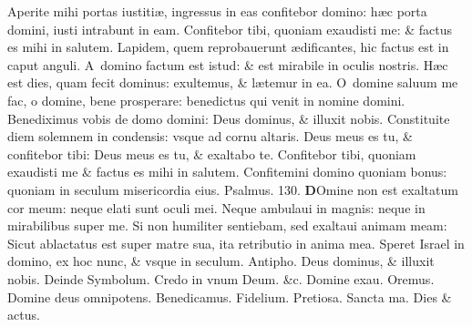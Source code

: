 \documentclass[a5paper,10pt]{book}
\def\ae{æ}
\begin{document}
\begin{multicols*}{2}
\newline \color{red} A\color{black}perite mihi portas iustiti\ae , ingressus in eas confitebor domino: h\ae c porta domini, iusti intrabunt in eam.
\newline \color{red} C\color{black}onfitebor tibi, quoniam exaudisti me: \& factus es mihi in salutem.
\newline \color{red} L\color{black}apidem, quem reprobauerunt \ae dificantes, hic factus est in caput anguli.
\newline \color{red} A\color{black}\ domino factum est istud: \& est mirabile in oculis nostris.
\newline \color{red} H\color{black}\ae c est dies, quam fecit dominus: exultemus, \& l\ae temur in ea.
\newline \color{red} O\color{black}\ domine saluum me fac, o domine, bene prosperare: benedictus qui venit in nomine domini.
\newline \color{red} B\color{black}enediximus vobis de domo domini: Deus dominus, \& illuxit nobis.
\newline \color{red} C\color{black}onstituite diem solemnem in condensis: vsque ad cornu altaris.
\newline \color{red} D\color{black}eus meus es tu, \& confitebor tibi: Deus meus es tu, \& exaltabo te.
\newline \color{red} C\color{black}onfitebor tibi, quoniam exaudisti me \& factus es mihi in salutem.
\newline \color{red} C\color{black}onfitemini domino quoniam bonus: quoniam in seculum misericordia eius.
\newline \color{red} Psalmus. 130. \color{black}
\lettrine[lines=2]{\bfseries \color{red} D}{}Omine non est exaltatum cor meum: neque elati sunt oculi mei.
\newline \color{red} N\color{black}eque ambulaui in magnis: neque in mirabilibus super me.
\newline \color{red} S\color{black}i non humiliter sentiebam, sed exaltaui animam meam:
\newline \color{red} S\color{black}icut ablactatus est super matre sua, ita retributio in anima mea.
\newline \color{red} S\color{black}peret Israel in domino, ex hoc nunc, \& vsque in seculum.
\newline \color{red} Antipho. \color{black} Deus dominus, \& illuxit nobis. \color{red} Deinde Symbolum. \color{black} Credo in vnum Deum. \&c. Domine exau. Oremus. Domine deus omnipotens. Benedicamus. Fidelium. Pretiosa. Sancta ma. Dies \& actus.

\end{multicols*}
\end{document}
